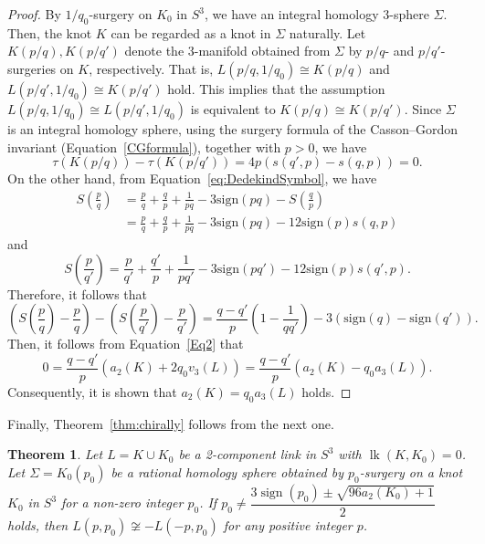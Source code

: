 \documentclass{amsart}
\newtheorem{theorem}{Theorem}
\theoremstyle{remark}
\newcommand{\sign}{\mathop{\mathrm{sign}}\nolimits}
\newcommand{\lk}{\mathop{\mathrm{lk}}\nolimits}
\begin{document}
\begin{proof}
By $1/q_0$-surgery on $K_0$ in $S^3$, we have an integral homology 3-sphere $\Sigma$. 
Then, the knot $K$ can be regarded as a knot in $\Sigma$ naturally. 
Let $K(p/q), K(p/q')$ denote the 3-manifold obtained from $\Sigma$ by $p/q$- and $p/q'$-surgeries on $K$, respectively. 
That is, $L(p/q,1/q_0) \cong K(p/q)$ and $L(p/q', 1/q_0) \cong K(p/q')$ hold. 
This implies that the assumption $L(p/q,1/q_0) \cong L(p/q', 1/q_0)$ is equivalent to $K(p/q) \cong K(p/q')$. 
Since $\Sigma$ is an integral homology sphere, using the surgery formula of the Casson--Gordon invariant (Equation~\eqref{CGformula}), together with $p>0$, we have 
\[
\tau (K(p/q)) - \tau (K(p/q')) = 4p\left( s(q',p) - s(q,p) \right)= 0. 
\]
On the other hand, from Equation~\eqref{eq:DedekindSymbol}, we have 
\begin{align*}
S\left(\frac{p}{q}\right) 
&= \frac{p}{q} + \frac{q}{p} + \frac{1}{pq} - 3 \mathrm{sign}(pq) - S \left( \frac{q}{p} \right) \\
&= 
\frac{p}{q} + \frac{q}{p} + \frac{1}{pq} - 3 \mathrm{sign}(pq) - 
12 \mathrm{sign}(p) s(q,p) 
\end{align*} 
and 
\[
S\left(\frac{p}{q'}\right) 
= 
\frac{p}{q'} + \frac{q'}{p} + \frac{1}{pq'} - 3 \mathrm{sign}(pq') - 
12 \mathrm{sign}(p) s(q',p).
\]
Therefore, 
it follows that 
\[
\left( S\left( \frac{p}{q} \right) - \frac{p}{q} \right)
- \left( S\left( \frac{p}{q'} \right) - \frac{p}{q'} \right) = 
\frac{q-q'}{p}\left( 1 - \frac{1}{qq'} \right) - 3 \left( \mathrm{sign}(q) - \mathrm{sign}(q') \right).
\]
Then, it follows from Equation~\eqref{Eq2} that 
\[
0
 = \frac{ q - q' }{ p } \left( a_2 (K) + 2 q_0 v_3(L) \right) 
 = \frac{ q - q' }{ p } \left( a_2 (K) - q_0 a_3(L) \right).
 \]
Consequently, it is shown that $a_2 (K) = q_0 a_3(L)$ holds. 
\end{proof}

Finally, Theorem~\ref{thm:chirally} follows from the next one.  

\begin{theorem}\label{thm6}
    Let $L = K \cup K_0$ be a 2-component link in $S^3$ with $\lk(K,K_0)=0$. 
    Let $\Sigma = K_0(p_0)$ be a rational homology sphere obtained by $p_0$-surgery on a knot $K_0$ in $S^3$ for a non-zero integer $p_0$. 
    If $p_0 \ne \dfrac{3 \sign(p_0) \pm \sqrt{96a_2(K_0)+1}}{2}$ holds, then $L(p,p_0) \not\cong - L(-p, p_0)$ for any positive integer $p$. 
\end{theorem}
\end{document}
